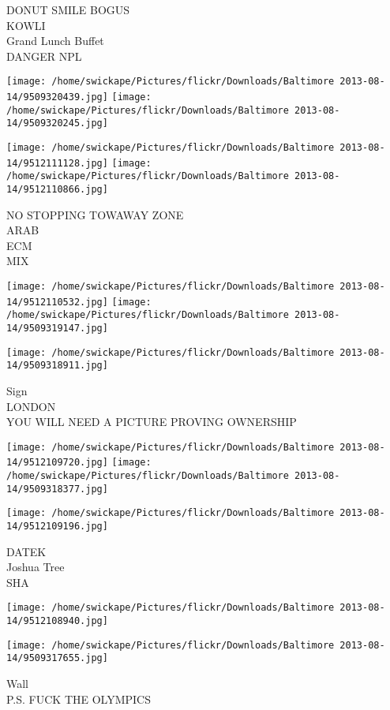\documentclass[10pt,letterpaper]{article}
\begin{document}
DONUT SMILE BOGUS\\
KOWLI\\
Grand Lunch Buffet\\
DANGER NPL
\pagebreak

\texttt{[image: /home/swickape/Pictures/flickr/Downloads/Baltimore 2013-08-14/9509320439.jpg]}
\texttt{[image: /home/swickape/Pictures/flickr/Downloads/Baltimore 2013-08-14/9509320245.jpg]}

\texttt{[image: /home/swickape/Pictures/flickr/Downloads/Baltimore 2013-08-14/9512111128.jpg]}
\texttt{[image: /home/swickape/Pictures/flickr/Downloads/Baltimore 2013-08-14/9512110866.jpg]}

NO STOPPING TOWAWAY ZONE\\
ARAB\\
ECM\\
MIX
\pagebreak

\texttt{[image: /home/swickape/Pictures/flickr/Downloads/Baltimore 2013-08-14/9512110532.jpg]}
\texttt{[image: /home/swickape/Pictures/flickr/Downloads/Baltimore 2013-08-14/9509319147.jpg]}

\vspace{0.25in}
\texttt{[image: /home/swickape/Pictures/flickr/Downloads/Baltimore 2013-08-14/9509318911.jpg]}

Sign\\
LONDON\\
YOU WILL NEED A PICTURE PROVING OWNERSHIP
\pagebreak

\texttt{[image: /home/swickape/Pictures/flickr/Downloads/Baltimore 2013-08-14/9512109720.jpg]}
\texttt{[image: /home/swickape/Pictures/flickr/Downloads/Baltimore 2013-08-14/9509318377.jpg]}

\texttt{[image: /home/swickape/Pictures/flickr/Downloads/Baltimore 2013-08-14/9512109196.jpg]}

DATEK\\
Joshua Tree\\
SHA
\pagebreak

\texttt{[image: /home/swickape/Pictures/flickr/Downloads/Baltimore 2013-08-14/9512108940.jpg]}

\vspace{0.25in}
\texttt{[image: /home/swickape/Pictures/flickr/Downloads/Baltimore 2013-08-14/9509317655.jpg]}

Wall\\
P.S. FUCK THE OLYMPICS
\pagebreak
\end{document}
